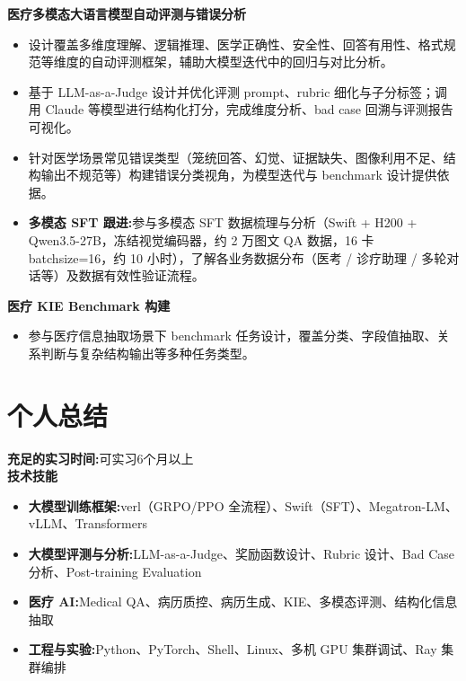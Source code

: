 \documentclass[11pt,a4paper]{article}
\begin{document}
\textbf{医疗多模态大语言模型自动评测与错误分析}
\begin{itemize}
    \item 设计覆盖多维度理解、逻辑推理、医学正确性、安全性、回答有用性、格式规范等维度的自动评测框架，辅助大模型迭代中的回归与对比分析。
    \item 基于 LLM-as-a-Judge 设计并优化评测 prompt、rubric 细化与子分标签；调用 Claude 等模型进行结构化打分，完成维度分析、bad case 回溯与评测报告可视化。
    \item 针对医学场景常见错误类型（笼统回答、幻觉、证据缺失、图像利用不足、结构输出不规范等）构建错误分类视角，为模型迭代与 benchmark 设计提供依据。
    \item \textbf{多模态 SFT 跟进:}参与多模态 SFT 数据梳理与分析（Swift + H200 + Qwen3.5-27B，冻结视觉编码器，约 2 万图文 QA 数据，16 卡 batchsize=16，约 10 小时），了解各业务数据分布（医考 / 诊疗助理 / 多轮对话等）及数据有效性验证流程。
\end{itemize}

\textbf{医疗 KIE Benchmark 构建}
\begin{itemize}
    \item 参与医疗信息抽取场景下 benchmark 任务设计，覆盖分类、字段值抽取、关系判断与复杂结构输出等多种任务类型。
\end{itemize}

\section{个人总结}

\textbf{充足的实习时间:}可实习6个月以上\\[4pt]
\textbf{技术技能}
\begin{itemize}
    \item \textbf{大模型训练框架:}verl（GRPO/PPO 全流程）、Swift（SFT）、Megatron-LM、vLLM、Transformers
    \item \textbf{大模型评测与分析:}LLM-as-a-Judge、奖励函数设计、Rubric 设计、Bad Case 分析、Post-training Evaluation
    \item \textbf{医疗 AI:}Medical QA、病历质控、病历生成、KIE、多模态评测、结构化信息抽取
    \item \textbf{工程与实验:}Python、PyTorch、Shell、Linux、多机 GPU 集群调试、Ray 集群编排
\end{itemize}
\end{document}
